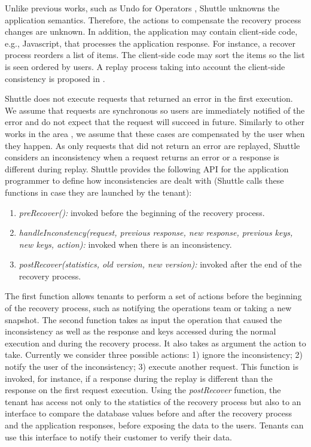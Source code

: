 Unlike previous works, such as Undo for Operators \cite{undoForOperators}, Shuttle unknowns the application semantics. Therefore, the actions to compensate the recovery process changes are unknown. In addition, the application may contain client-side code, e.g., Javascript, that processes the application response. For instance, a recover process reorders a list of items. The client-side code may sort the items so the list is seen ordered by users. A replay process taking into account the client-side consistency is proposed in \cite{warp}.


Shuttle does not execute requests that returned an error in the first execution. We assume that requests are synchronous so users are immediately notified of the error and do not expect that the request will succeed in future. Similarly to other works in the area \cite{undoForOperators}, we assume that these cases are compensated by the user when they happen. As only requests that did not return an error are replayed, Shuttle considers an inconsistency when a request returns an error or a response is different during replay. Shuttle provides the following \ac{API} for the application programmer to define how inconsistencies are dealt with (Shuttle calls these functions in case they are launched by the tenant):

\begin{enumerate}
  \item \textit{preRecover():} invoked before the beginning of the recovery process.
  \item \textit{handleInconstency(request, previous response, new response, previous keys, new keys, action):} invoked when there is an inconsistency.
  \item \textit{postRecover(statistics, old version, new version):} invoked after the end of the recovery process.
\end{enumerate}

The first function allows tenants to perform a set of actions before the beginning of the recovery process, such as notifying the operations team or taking a new snapshot. 
The second function takes as input the operation that caused the inconsistency as well as the response and keys accessed during the normal execution and during the recovery process. It also takes as argument the action to take. Currently we consider three possible actions: 1) ignore the inconsistency; 2) notify the user of the inconsistency; 3) execute another request. This function is invoked, for instance, if a response during the replay is different than the response on the first request execution.
Using the \textit{postRecover} function, the tenant has access not only to the statistics of the recovery process but also to an interface to compare the database values before and after the recovery process and the application responses, before exposing the data to the users. 
Tenants can use this interface to notify their customer to verify their data.

